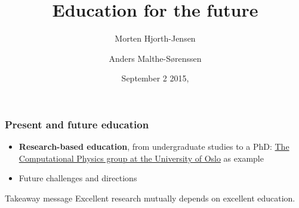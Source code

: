\documentclass{beamer}
\begin{document}







\title{Education for the future}


\author{Morten Hjorth-Jensen
\and
Anders Malthe-Sørenssen}

\date{September 2 2015,
}

\begin{frame}
\titlepage
\end{frame}

\begin{frame}
\frametitle{Present and future education}

\begin{block}{}

\begin{itemize}
\item \textbf{Research-based education}, from undergraduate studies to a PhD: \href{{http://www.mn.uio.no/fysikk/english/research/groups/computational/index.html}}{The Computational Physics group at the University of Oslo} as example

\item Future challenges and directions
\end{itemize}

\noindent
\end{block}
\begin{block}{Takeaway message }
Excellent research mutually depends on excellent education.
\end{block}
\end{frame}
\end{document}
